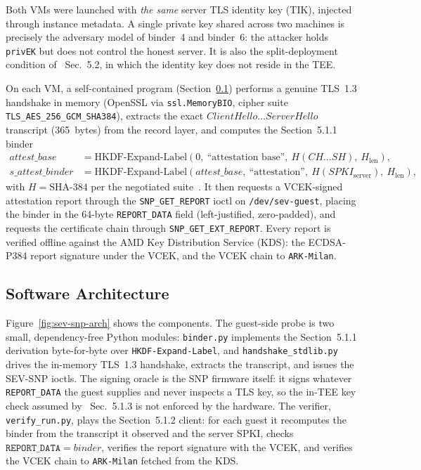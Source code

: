 Both VMs were launched with \emph{the same} server TLS identity key (TIK),
injected through instance metadata. A single private key shared across two
machines is precisely the adversary model of binder~4 and binder~6: the
attacker holds \texttt{privEK} but does not control the honest server. It is
also the split-deployment condition of \spec{}~Sec.~5.2, in which the identity
key does not reside in the TEE.

On each VM, a self-contained program (Section~\ref{sec:sev-snp-arch}) performs a
genuine TLS~1.3 handshake in memory (OpenSSL via \texttt{ssl.MemoryBIO},
cipher suite \texttt{TLS\_AES\_256\_GCM\_SHA384}), extracts the exact
$\mathit{ClientHello}\dots\mathit{ServerHello}$ transcript (365~bytes) from the
record layer, and computes the Section~5.1.1 binder
\[
\begin{aligned}
\mathit{attest\_base} &= \mathrm{HKDF\text{-}Expand\text{-}Label}(0,\ \text{``attestation base''},\ H(\mathit{CH}\dots\mathit{SH}),\ H_\text{len}),\\
\mathit{s\_attest\_binder} &= \mathrm{HKDF\text{-}Expand\text{-}Label}(\mathit{attest\_base},\ \text{``attestation''},\ H(\mathit{SPKI}_\text{server}),\ H_\text{len}),
\end{aligned}
\]
with $H=\text{SHA-384}$ per the negotiated suite~. It then requests a
VCEK-signed attestation report through the \texttt{SNP\_GET\_REPORT} ioctl on
\texttt{/dev/sev-guest}, placing the binder in the 64-byte \texttt{REPORT\_DATA}
field (left-justified, zero-padded), and requests the certificate chain through
\texttt{SNP\_GET\_EXT\_REPORT}. Every report is verified offline against the AMD
Key Distribution Service (KDS): the ECDSA-P384 report signature under the VCEK,
and the VCEK chain to \texttt{ARK-Milan}.

\subsection{Software Architecture}
\label{sec:sev-snp-arch}

Figure~\ref{fig:sev-snp-arch} shows the components. The guest-side probe is two
small, dependency-free Python modules: \texttt{binder.py} implements the
Section~5.1.1 derivation byte-for-byte over \texttt{HKDF-Expand-Label}, and
\texttt{handshake\_stdlib.py} drives the in-memory TLS~1.3 handshake, extracts
the transcript, and issues the SEV-SNP ioctls. The signing oracle is the SNP
firmware itself: it signs whatever \texttt{REPORT\_DATA} the guest supplies and
never inspects a TLS key, so the in-TEE key check assumed by \spec{}~Sec.~5.1.3
is not enforced by the hardware. The verifier, \texttt{verify\_run.py}, plays
the Section~5.1.2 client: for each guest it recomputes the binder from the
transcript it observed and the server SPKI, checks
$\texttt{REPORT\_DATA}=\mathit{binder}$, verifies the report signature with the
VCEK, and verifies the VCEK chain to \texttt{ARK-Milan} fetched from the KDS.

